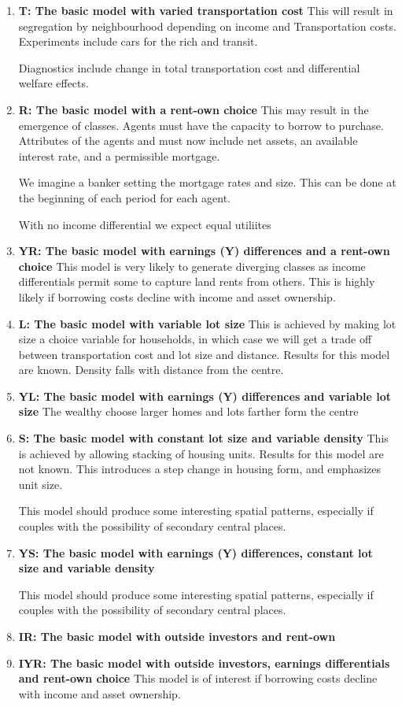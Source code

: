 \begin{enumerate}
\item \textbf{T: The basic model with varied transportation cost }
This will result in segregation by neighbourhood depending on income and Transportation costs. Experiments include cars for the rich and  transit. 

Diagnostics include change in total transportation cost and differential welfare effects.

\item \textbf{R: The basic model with a rent-own choice}
This may result in the emergence of classes. Agents must have the capacity to borrow to purchase. Attributes of the agents and must now include  net assets,  an available interest rate, and a permissible mortgage.

We imagine a banker setting the mortgage rates and size. This can be done at the beginning of each period for each agent. 

With no income differential we expect equal utiliites

\item \textbf{YR: The basic model with earnings (Y) differences and a rent-own choice}
This model is very likely to generate diverging classes as income differentials permit some to capture land rents from others. This is highly likely if borrowing costs decline with income and asset ownership.

\item \textbf{L: The basic model with variable lot size}
This is achieved by making lot size a choice variable for households, in which case we will get a trade off between transportation cost and lot size and distance. Results for this model are known. Density  falls with distance from the centre. 

\item \textbf{YL: The basic model with earnings (Y) differences and variable lot size}
The wealthy choose larger homes and lots farther form the centre

\item \textbf{S: The basic model with constant lot size and variable density}
This is achieved by allowing stacking of housing units. Results for this model are not known. This introduces a step change in housing form, and emphasizes unit size.

This model should produce some interesting spatial patterns, especially if couples with the possibility of secondary central places.

\item \textbf{YS: The basic model with earnings (Y) differences, constant lot size and variable density}

This model should produce some interesting spatial patterns, especially if couples with the possibility of secondary central places.

\item \textbf{IR: The basic model with outside investors and rent-own}

\item \textbf{IYR: The basic model with outside investors, earnings differentials and rent-own choice} This model is of interest if borrowing costs decline with income and asset ownership.
\end{enumerate}
